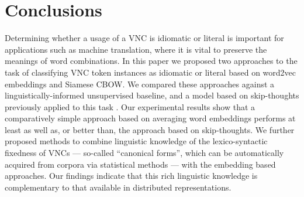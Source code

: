 \documentclass[11pt,a4paper]{article}
\begin{document}





\section{Conclusions}\label{conclusion}

Determining whether a usage of a VNC is idiomatic or literal is
important for applications such as machine translation, where it is
vital to preserve the meanings of word combinations. 
In this paper we proposed two approaches to the task of classifying
VNC token instances as idiomatic or literal based on word2vec
embeddings and Siamese CBOW. We compared these approaches against a
linguistically-informed unsupervised baseline, and a model based on
skip-thoughts previously applied to this task
\citep{salton-ross-kelleher}. Our experimental results show that a
comparatively simple approach based on averaging word embeddings
performs at least as well as, or better than, the approach based on
skip-thoughts. We further proposed methods to combine linguistic
knowledge of the lexico-syntactic fixedness of VNCs --- so-called
``canonical forms'', which can be automatically acquired from corpora
via statistical methods --- with the embedding based approaches. Our
findings indicate that this rich linguistic knowledge is complementary
to that available in distributed representations.
\end{document}
